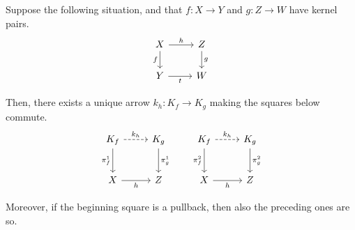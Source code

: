 \documentclass[runningheads,envcountsect]{llncs}
\begin{document}
\begin{lemma}\label{lemma:kern_pairs_pres_pullbacks}
    Suppose the following situation, and that $f: X \to Y$ and $g: Z \to W$ have kernel pairs.
    \[
        \begin{tikzcd}
            X \ar[r, "h"] \ar[d, "f"swap] & Z \ar[d, "g"] \\
            Y \ar[r, "t"swap] & W
        \end{tikzcd}
    \]
    
    Then, there exists a unique arrow $k_h: K_f \to K_g$ making the squares below commute.
    \[
        \begin{tikzcd}[row sep = 25 pt, column sep= 25 pt]
            K_f \ar[r, dashed, "{k_h}"] \ar[d, "{\pi_f^1}"swap] & K_g \ar[d, "{\pi_g^1}"] \\
            X \ar[r, "h"swap] & Z 
        \end{tikzcd}
        \qquad
        \begin{tikzcd}[row sep = 25 pt, column sep= 25 pt]
            K_f \ar[r, dashed, "{k_h}"] \ar[d, "{\pi_f^2}"swap] & K_g \ar[d, "{\pi_g^2}"] \\
            X \ar[r, "h"swap] & Z 
        \end{tikzcd}
    \]

    Moreover, if the beginning square is a pullback, then also the preceding ones are so.
\end{lemma}
\end{document}
